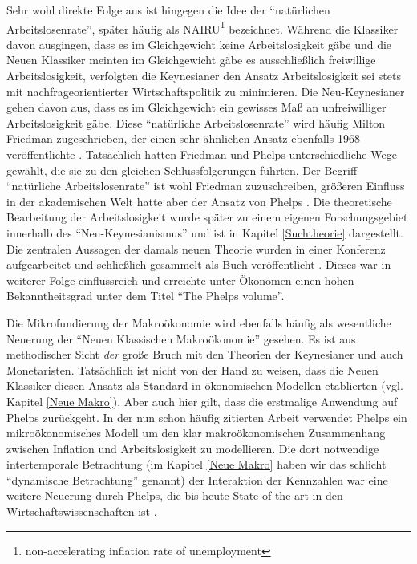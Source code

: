 Sehr wohl direkte Folge aus \textcite{Phelps1968} ist hingegen die Idee der "`natürlichen Arbeitslosenrate"', später häufig als NAIRU\footnote{non-accelerating inflation rate of unemployment} bezeichnet. Während die Klassiker davon ausgingen, dass es im Gleichgewicht keine Arbeitslosigkeit gäbe und die Neuen Klassiker meinten im Gleichgewicht gäbe es ausschließlich freiwillige Arbeitslosigkeit, verfolgten die Keynesianer den Ansatz Arbeitslosigkeit sei stets mit nachfrageorientierter Wirtschaftspolitik zu minimieren. Die Neu-Keynesianer gehen davon aus, dass es im Gleichgewicht ein gewisses Maß an unfreiwilliger Arbeitslosigkeit gäbe. Diese "`natürliche Arbeitslosenrate"' wird häufig Milton Friedman zugeschrieben, der einen sehr ähnlichen Ansatz ebenfalls 1968 veröffentlichte \parencite{Friedman1968}. Tatsächlich hatten Friedman und Phelps unterschiedliche Wege gewählt, die sie zu den gleichen Schlussfolgerungen führten. Der Begriff "`natürliche Arbeitslosenrate"' ist wohl Friedman zuzuschreiben, größeren Einfluss in der akademischen Welt hatte aber der Ansatz von Phelps \textcite[S. 9f]{Nobelpreis-Komitee2006}. Die theoretische Bearbeitung der Arbeitslosigkeit wurde später zu einem eigenen Forschungsgebiet innerhalb des "`Neu-Keynesianismus"' und ist in Kapitel \ref{Suchtheorie} dargestellt.
Die zentralen Aussagen der damals neuen Theorie wurden in einer Konferenz aufgearbeitet und schließlich gesammelt als Buch veröffentlicht \textcite{Phelps1970}. Dieses war in weiterer Folge einflussreich und erreichte unter Ökonomen einen hohen Bekanntheitsgrad unter dem Titel "`The Phelps volume"'.

Die Mikrofundierung der Makroökonomie wird ebenfalls häufig als wesentliche Neuerung der "`Neuen Klassischen Makroökonomie"' gesehen. Es ist aus methodischer Sicht \textit{der} große Bruch mit den Theorien der Keynesianer und auch Monetaristen. Tatsächlich ist nicht von der Hand zu weisen, dass die Neuen Klassiker diesen Ansatz als Standard in ökonomischen Modellen etablierten (vgl. Kapitel \ref{Neue Makro}). Aber auch hier gilt, dass die erstmalige Anwendung auf Phelps zurückgeht. In der nun schon häufig zitierten Arbeit \textcite{Phelps1968} verwendet Phelps ein mikroökonomisches Modell um den klar makroökonomischen Zusammenhang zwischen Inflation und Arbeitslosigkeit zu modellieren. Die dort notwendige intertemporale Betrachtung (im Kapitel \ref{Neue Makro} haben wir das schlicht "`dynamische Betrachtung"' genannt) der Interaktion der Kennzahlen war eine weitere Neuerung durch Phelps, die bis heute State-of-the-art in den Wirtschaftswissenschaften ist \parencite[S. 9]{Nobelpreis-Komitee2006}.

